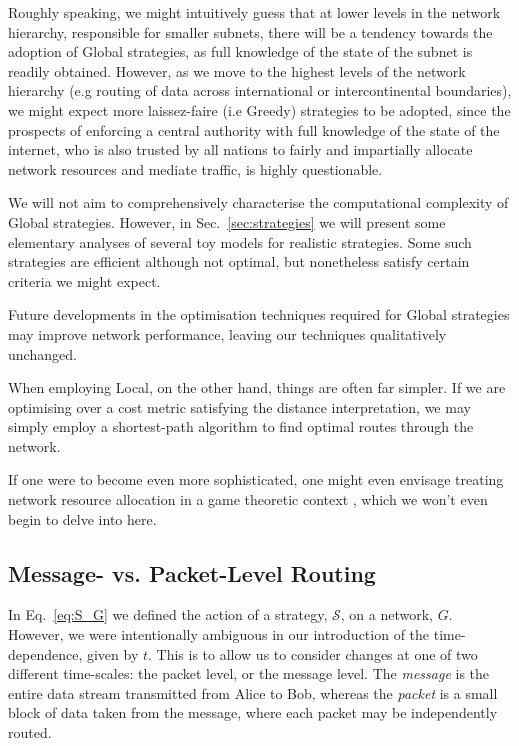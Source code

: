 \documentclass[aps,rmp,twocolumn,amsmath,amssymb,nofootinbib,superscriptaddress]{revtex4}
\begin{document}
Roughly speaking, we might intuitively guess that at lower levels in the network hierarchy, responsible for smaller subnets, there will be a tendency towards the adoption of {\sc Global} strategies, as full knowledge of the state of the subnet is readily obtained. However, as we move to the highest levels of the network hierarchy (e.g routing of data across international or intercontinental boundaries), we might expect more laissez-faire (i.e {\sc Greedy}) strategies to be adopted, since the prospects of enforcing a central authority with full knowledge of the state of the internet, who is also trusted by all nations to fairly and impartially allocate network resources and mediate traffic, is highly questionable.

We will not aim to comprehensively characterise the computational complexity of {\sc Global} strategies. However, in Sec.~\ref{sec:strategies} we will present some elementary analyses of several toy models for realistic strategies. Some such strategies are efficient although not optimal, but nonetheless satisfy certain criteria we might expect.

Future developments in the optimisation techniques required for {\sc Global} strategies may improve network performance, leaving our techniques qualitatively unchanged.

When employing {\sc Local}, on the other hand, things are often far simpler. If we are optimising over a cost metric satisfying the distance interpretation, we may simply employ a shortest-path algorithm to find optimal routes through the network.

If one were to become even more sophisticated, one might even envisage treating network resource allocation in a game theoretic context \cite{???}, which we won't even begin to delve into here.

%
%

\subsection{Message- vs. Packet-Level Routing}

In Eq.~\ref{eq:S_G} we defined the action of a strategy, $\mathcal{S}$, on a network, $G$. However, we were intentionally ambiguous in our introduction of the time-dependence, given by $t$. This is to allow us to consider changes at one of two different time-scales: the packet level, or the message level. The \emph{message} is the entire data stream transmitted from Alice to Bob, whereas the \emph{packet} is a small block of data taken from the message, where each packet may be independently routed.
\end{document}
